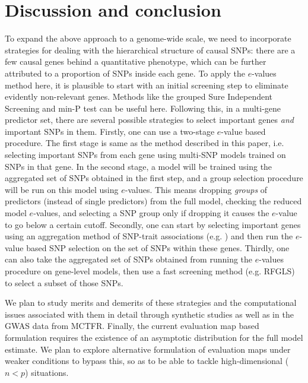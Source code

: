 \section{Discussion and conclusion}
\label{sec:endSection}


To expand the above approach to a genome-wide scale, we need to incorporate strategies for dealing with the hierarchical structure of causal SNPs: there are a few causal genes behind a quantitative phenotype, which can be further attributed to a proportion of SNPs inside each gene. To apply the $e$-values method here, it is plausible to start with an initial screening step to eliminate evidently non-relevant genes. Methods like the grouped Sure Independent Screening \citep{LiZhongZhu12} and min-P test \citep{WestfallYoungBook93} can be useful here. Following this, in a multi-gene predictor set, there are several possible strategies to select important genes \textit{and} important SNPs in them. Firstly, one can use a two-stage $e$-value based procedure. The first stage is same as the method described in this paper, i.e. selecting important SNPs from each gene using multi-SNP models trained on SNPs in that gene. In the second stage, a model will be trained using the aggregated set of SNPs obtained in the first step, and a group selection procedure will be run on this model using $e$-values. This means dropping \textit{groups} of predictors (instead of single predictors) from the full model, checking the reduced model $e$-values, and selecting a SNP group only if dropping it causes the $e$-value to go below a certain cutoff. Secondly, one can start by selecting important genes using an aggregation method of SNP-trait associations (e.g. \cite{LamparterEtal16}) and then run the $e$-value based SNP selection on the set of SNPs within these genes. Thirdly, one can also take the aggregated set of SNPs obtained from running the $e$-values procedure on gene-level models, then use a fast screening method (e.g. RFGLS) to select a subset of those SNPs.

We plan to study merits and demerits of these strategies and the computational issues associated with them in detail through synthetic studies as well as in the GWAS data from MCTFR. Finally, the current evaluation map based formulation requires the existence of an asymptotic distribution for the full model estimate. We plan to explore alternative formulation of evaluation maps under weaker conditions to bypass this, so as to be able to tackle high-dimensional ($n < p$) situations.